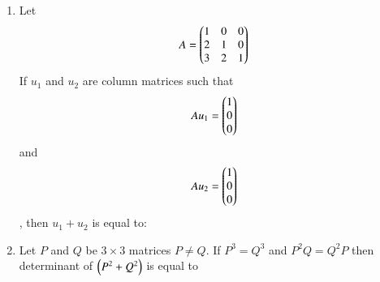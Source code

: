 \documentclass[journal,12pt,twocolumn]{IEEEtran}
\theoremstyle{remark}
\begin{document}
\begin{enumerate}
	\item Let \begin{align*}
	A = \begin{pmatrix} 
		1&0&0\\
		2&1&0\\
		3&2&1
	\end{pmatrix}
	\end{align*} If $u_1$ and $u_2$ are column matrices such that
	\begin{align*}
		Au_1 = \begin{pmatrix}1\\0\\0\end{pmatrix}
	\end{align*} and 
	\begin{align*}
		Au_2 = \begin{pmatrix}1\\0\\0\end{pmatrix}
	\end{align*}, then $u_1 + u_2$ is equal to:
	\hfill{}
        \begin{enumerate}
        \end{enumerate}

	\item Let $P$ and $Q$ be $3\times3$ matrices $P\neq Q$. If $P^3=Q^3$ and $P^2Q=Q^2P$ then determinant of $\left(P^2+Q^2\right)$ is equal to
	\hfill{}
        \begin{enumerate}
        \end{enumerate}


\end{enumerate}
\end{document}
